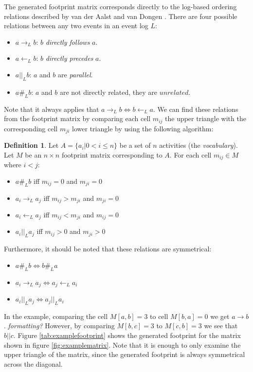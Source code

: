 \documentclass[english,12pt,a4paper,pdftex,sci,utf8]{aaltothesis}
\theoremstyle{definition}
\newtheorem{definition}{Definition}
\newcommand{\nyi}[1]{\noindent\colorbox{nyibg}{\textcolor{nyitext}{\emph{#1}}}}
\begin{document}
The generated footprint matrix corresponds directly to the log-based ordering relations described by van der Aalst and van Dongen \cite{van2013discovering,van2016process}.
There are four possible relations between any two events in an event log $L$:
\begin{itemize}
    \item $a \rightarrow_L b$: $b$ \emph{directly follows} $a$.
    \item $a \leftarrow_L b$: $b$ \emph{directly precedes} $a$.
    \item $a ||_L b$: $a$ and $b$ are \emph{parallel}.
    \item $a \#_L b$: $a$ and $b$ are not directly related, they are $unrelated$.
\end{itemize}

Note that it always applies that $a \rightarrow_L b \Leftrightarrow b \leftarrow_L a$.
We can find these relations from the footprint matrix by comparing each cell $m_{ij}$ the upper triangle with the corresponding cell $m_{ji}$ lower triangle by using the following algorithm:

\begin{definition}
Let $A = \{ a_i | 0 < i \le n \}$ be a set of $n$ activities (the \emph{vocabulary}).
Let $M$ be an $n \times n$ footprint matrix corresponding to $A$.
For each cell $m_{ij} \in M$ where $i < j$:
\begin{itemize}
    \item $a \#_L b$ iff $m_{ij} = 0$ and $m_{ji} = 0$
    \item $a_i \rightarrow_L a_j$ iff $m_{ij} > m_{ji}$ and $m_{ji} = 0$
    \item $a_i \leftarrow_L a_j$ iff $m_{ij} < m_{ji}$ and $m_{ij} = 0$
    \item $a_i ||_L a_j$ iff $m_{ij} > 0$ and $m_{ji} > 0$
\end{itemize}
Furthermore, it should be noted that these relations are symmetrical:
\begin{itemize}
    \item $a \#_L b \Leftrightarrow b \#_L a$ 
    \item $a_i \rightarrow_L a_j \Leftrightarrow a_j \leftarrow_L a_i$
    \item $a_i ||_L a_j \Leftrightarrow a_j ||_L a_i$ 
\end{itemize}
\label{def:logrelations}
\end{definition}

In the example, comparing the cell $M[a,b] = 3$ to cell $M[b,a] = 0$ we get $a \rightarrow b$. \nyi{formatting?}
However, by comparing $M[b,c] = 3$ to $M[c,b] = 3$ we see that $b || c$. 
Figure \ref{tab:examplefootprint} shows the generated footprint for the matrix shown in figure \ref{fig:examplematrix}.
Note that it is enough to only examine the upper triangle of the matrix, since the generated footprint is always symmetrical across the diagonal.
\end{document}
